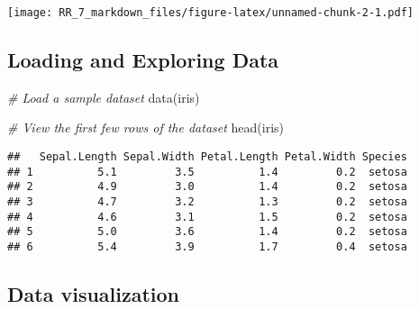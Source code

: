 \documentclass[
]{article}
\newenvironment{Shaded}{\begin{snugshade}}{\end{snugshade}}
\newcommand{\AttributeTok}[1]{\textcolor[rgb]{0.77,0.63,0.00}{#1}}
\newcommand{\CommentTok}[1]{\textcolor[rgb]{0.56,0.35,0.01}{\textit{#1}}}
\newcommand{\DecValTok}[1]{\textcolor[rgb]{0.00,0.00,0.81}{#1}}
\newcommand{\FunctionTok}[1]{\textcolor[rgb]{0.00,0.00,0.00}{#1}}
\newcommand{\NormalTok}[1]{#1}
\newcommand{\SpecialCharTok}[1]{\textcolor[rgb]{0.00,0.00,0.00}{#1}}
\newcommand{\StringTok}[1]{\textcolor[rgb]{0.31,0.60,0.02}{#1}}
\begin{document}
\texttt{[image: RR\_7\_markdown\_files/figure-latex/unnamed-chunk-2-1.pdf]}

\hypertarget{loading-and-exploring-data}{%
\subsection{Loading and Exploring
Data}\label{loading-and-exploring-data}}

\begin{Shaded}
\begin{Highlighting}[]
\CommentTok{\# Load a sample dataset}
\FunctionTok{data}\NormalTok{(iris)}

\CommentTok{\# View the first few rows of the dataset}
\FunctionTok{head}\NormalTok{(iris)}
\end{Highlighting}
\end{Shaded}

\begin{verbatim}
##   Sepal.Length Sepal.Width Petal.Length Petal.Width Species
## 1          5.1         3.5          1.4         0.2  setosa
## 2          4.9         3.0          1.4         0.2  setosa
## 3          4.7         3.2          1.3         0.2  setosa
## 4          4.6         3.1          1.5         0.2  setosa
## 5          5.0         3.6          1.4         0.2  setosa
## 6          5.4         3.9          1.7         0.4  setosa
\end{verbatim}

\hypertarget{data-visualization}{%
\subsection{Data visualization}\label{data-visualization}}

\begin{Shaded}
\end{Shaded}
\end{document}
